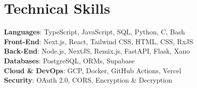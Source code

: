 \documentclass[letterpaper,11pt]{article}
\begin{document}
\section{Technical Skills}
 \begin{itemize}[leftmargin=0.15in, label={}]
    \small{\item{
     \textbf{Languages}{: TypeScript, JavaScript, SQL, Python, C, Bash} \\
     \textbf{Front-End}{: Next.js, React, Tailwind CSS, HTML, CSS, RxJS} \\
     \textbf{Back-End}{: Node.js, NextJS, Remix.js, FastAPI, Flask, Xano} \\
     \textbf{Databases}{: PostgreSQL, ORMs, Supabase} \\
     \textbf{Cloud \& DevOps}{: GCP, Docker, GitHub Actions, Vercel} \\
     \textbf{Security}{: OAuth 2.0, CORS, Encryption \& Decryption} \\
    }}
 \end{itemize}

\end{document}
